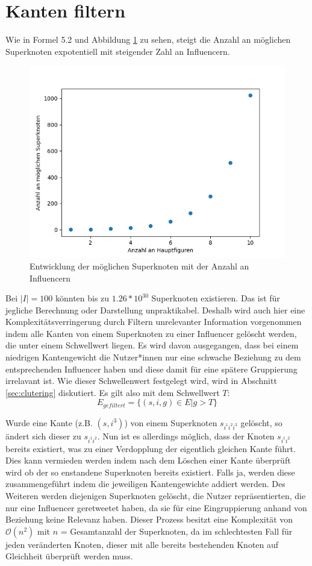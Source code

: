 \section{Kanten filtern}
\label{sec:kanten-filtern}
Wie in Formel 5.2 und Abbildung \ref{fig:superknotenentwicklung} zu sehen, steigt die Anzahl an möglichen Superknoten expotentiell mit steigender Zahl an Influencern.
\begin{figure}[h]
	\centering
	\includegraphics[width=0.7\linewidth]{images/Superknotenentwicklung}
	\caption{Entwicklung der möglichen Superknoten mit der Anzahl an Influencern}
	\label{fig:superknotenentwicklung}
\end{figure}
Bei $|I| = 100$ könnten bis zu $1.26*10^{30}$ Superknoten existieren. Das ist für jegliche Berechnung oder Darstellung unpraktikabel.
Deshalb wird auch hier eine Komplexitätsverringerung durch Filtern unrelevanter Information vorgenommen indem alle Kanten von einem Superknoten zu einer Influencer gelöscht werden, die unter einem Schwellwert liegen. 
Es wird davon ausgegangen, dass  bei einem niedrigen Kantengewicht die Nutzer*innen nur eine schwache Beziehung zu dem entsprechenden Influencer haben und diese damit für eine spätere Gruppierung irrelavant ist. 
Wie dieser Schwellenwert festgelegt wird, wird in Abschnitt \ref{sec:clutering} diskutiert. 
Es gilt also mit dem Schwellwert $T$: \begin{equation}
	E_{gefiltert} = \{(s,i,g)\in E|g>T\}
\end{equation}

Wurde eine Kante (z.B. $(s,i^3)$) von einem Superknoten $s_{i^1i^2i^3}$ gelöscht, so ändert sich dieser zu $s_{i^1i^2}$. Nun ist es allerdings möglich, dass der Knoten $s_{i^1i^2}$ bereits existiert, was zu einer Verdopplung der eigentlich gleichen Kante führt. Dies kann vermieden werden indem nach dem Löschen einer Kante überprüft wird ob der so enstandene Superknoten bereits existiert. Falls ja, werden diese zusammengeführt indem die jeweiligen Kantengewichte addiert werden.
Des Weiteren werden diejenigen Superknoten gelöscht, die Nutzer repräsentierten, die nur eine Influencer \gls{geretweetet} haben, da sie für eine Eingruppierung anhand von Beziehung keine Relevanz haben.
Dieser Prozess besitzt eine Komplexität von $\mathcal{O}(n^2)$ mit $n$ = Gesamtanzahl der Superknoten, da im schlechtesten Fall für jeden veränderten Knoten, dieser mit alle bereits bestehenden Knoten auf Gleichheit überprüft werden muss.
